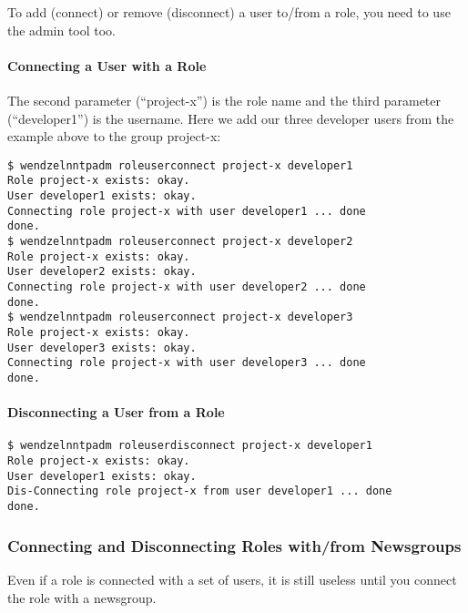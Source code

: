 \documentclass[12pt,fleqn,leqno]{scrbook}
\begin{document}
To add (connect) or remove (disconnect) a user to/from a role, you need
to use the admin tool too.

\hypertarget{connecting-a-user-with-a-role-1}{%
\paragraph{Connecting a User with a
Role}\label{connecting-a-user-with-a-role-1}}

The second parameter (``project-x'') is the role name and the third
parameter (``developer1'') is the username. Here we add our three
developer users from the example above to the group project-x:

\begin{verbatim}
$ wendzelnntpadm roleuserconnect project-x developer1
Role project-x exists: okay.
User developer1 exists: okay.
Connecting role project-x with user developer1 ... done
done.
$ wendzelnntpadm roleuserconnect project-x developer2
Role project-x exists: okay.
User developer2 exists: okay.
Connecting role project-x with user developer2 ... done
done.
$ wendzelnntpadm roleuserconnect project-x developer3
Role project-x exists: okay.
User developer3 exists: okay.
Connecting role project-x with user developer3 ... done
done.
\end{verbatim}

\hypertarget{disconnecting-a-user-from-a-role-1}{%
\paragraph{Disconnecting a User from a
Role}\label{disconnecting-a-user-from-a-role-1}}

\begin{verbatim}
$ wendzelnntpadm roleuserdisconnect project-x developer1
Role project-x exists: okay.
User developer1 exists: okay.
Dis-Connecting role project-x from user developer1 ... done
done.
\end{verbatim}

\hypertarget{connecting-and-disconnecting-roles-withfrom-newsgroups-1}{%
\subsubsection{Connecting and Disconnecting Roles with/from
Newsgroups}\label{connecting-and-disconnecting-roles-withfrom-newsgroups-1}}

Even if a role is connected with a set of users, it is still useless
until you connect the role with a newsgroup.
\end{document}
